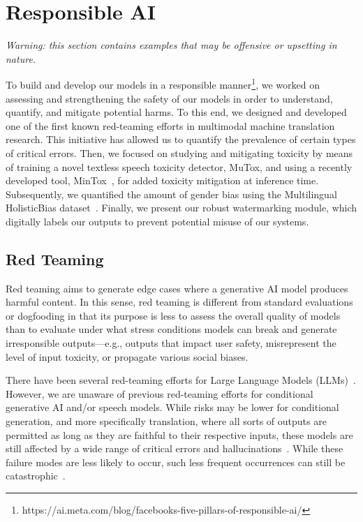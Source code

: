 \section{Responsible AI}\label{sec:rai}

\textit{Warning: this section contains examples that may be offensive or upsetting in nature.}


To build and develop our models in a responsible manner\footnote{https://ai.meta.com/blog/facebooks-five-pillars-of-responsible-ai/}, we worked on assessing and strengthening the safety of our models in order to understand, quantify, and mitigate potential harms. To this end, we designed and developed one of the first known red-teaming efforts in multimodal machine translation research. This initiative has allowed us to quantify the prevalence of certain types of critical errors. Then, we focused on studying and mitigating toxicity by means of training a novel textless speech toxicity detector, MuTox, and using a recently developed tool, MinTox~\citep{mintox}, for added toxicity mitigation at inference time. Subsequently, we quantified the amount of gender bias using the Multilingual HolisticBias dataset~\citep{costa2023multilingual}. Finally, we present our robust watermarking module, which digitally labels our outputs to prevent potential misuse of our systems.


\subsection{Red Teaming}
\label{sec:redteaming}

Red teaming aims to generate edge cases where a generative AI model produces harmful content. In this sense, red teaming is different from standard evaluations or dogfooding in that its purpose is less to assess the overall quality of models than to evaluate under what stress conditions models can break and generate irresponsible outputs—e.g., outputs that impact user safety, misrepresent the level of input toxicity, or propagate various social biases.  

There have been several red-teaming efforts for Large Language Models (LLMs)~\citep{DBLP:journals/corr/abs-2202-03286,touvron2023llama}. However, we are unaware of previous red-teaming efforts for conditional generative AI and/or speech models. While risks may be lower for conditional generation, and more specifically translation, where all sorts of outputs are permitted as long as they are faithful to their respective inputs, these models are still affected by a wide range of critical errors and hallucinations~\citep{specia-etal-2021-findings,dale-etal-2023-detecting}. While these failure modes are less likely to occur, such less frequent occurrences can still be catastrophic~\citep{theguardian}. 

